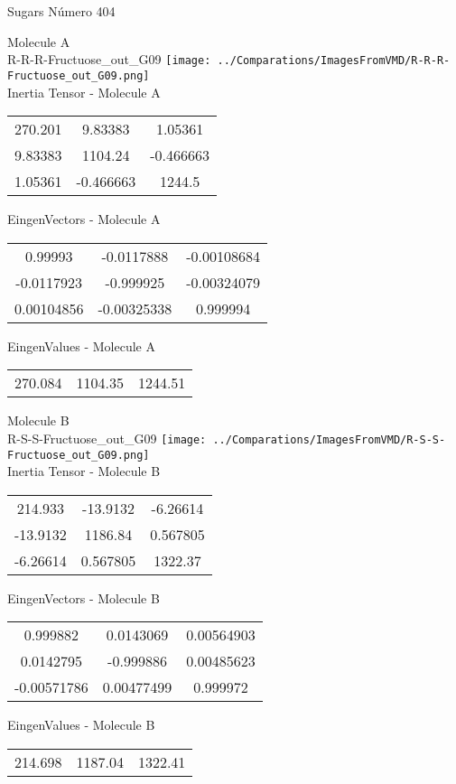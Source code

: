 \vtab[-2cm]
\begin{center}
{\large Sugars \tab Número 404}
\end{center}
\begin{multicols}{2}
\begin{center}

Molecule A \\ 
R-R-R-Fructuose\_out\_G09
\texttt{[image: ../Comparations/ImagesFromVMD/R-R-R-Fructuose\_out\_G09.png]}
\\
Inertia Tensor - Molecule A \\
\vtab

\begin{tabular}{|c c c|}
270.201	 & 	9.83383	 & 	1.05361	 \\
9.83383	 & 	1104.24	 & 	-0.466663	 \\
1.05361	 & 	-0.466663	 & 	1244.5
\end{tabular}

\vtab
 EingenVectors - Molecule A     \\
\vtab
\begin{tabular}{|c c c|}
0.99993	 & 	-0.0117888	 & 	-0.00108684	 \\
-0.0117923	 & 	-0.999925	 & 	-0.00324079	 \\
0.00104856	 & 	-0.00325338	 & 	0.999994
\end{tabular}

\vtab
 EingenValues - Molecule A     \\
\vtab
\begin{tabular}{|c c c|}
270.084	 & 	1104.35	 & 	1244.51	 \\
\end{tabular}
\columnbreak

Molecule B \\ 
R-S-S-Fructuose\_out\_G09
\texttt{[image: ../Comparations/ImagesFromVMD/R-S-S-Fructuose\_out\_G09.png]}
\\
Inertia Tensor - Molecule B \\
\vtab

\begin{tabular}{|c c c|}
214.933	 & 	-13.9132	 & 	-6.26614	 \\
-13.9132	 & 	1186.84	 & 	0.567805	 \\
-6.26614	 & 	0.567805	 & 	1322.37
\end{tabular}

\vtab
 EingenVectors - Molecule B     \\
\vtab
\begin{tabular}{|c c c|}
0.999882	 & 	0.0143069	 & 	0.00564903	 \\
0.0142795	 & 	-0.999886	 & 	0.00485623	 \\
-0.00571786	 & 	0.00477499	 & 	0.999972
\end{tabular}

\vtab
 EingenValues - Molecule B     \\
\vtab
\begin{tabular}{|c c c|}
214.698	 & 	1187.04	 & 	1322.41	 \\
\end{tabular}

\end{center}
\end{multicols}
